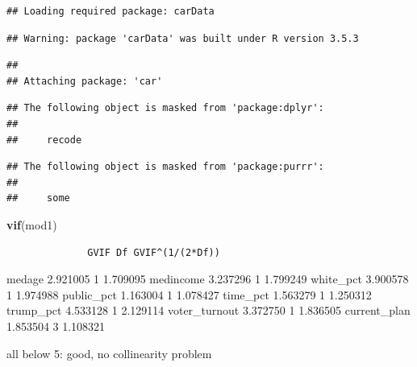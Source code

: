 \documentclass[
]{article}
\newenvironment{Shaded}{\begin{snugshade}}{\end{snugshade}}
\newcommand{\KeywordTok}[1]{\textcolor[rgb]{0.13,0.29,0.53}{\textbf{#1}}}
\newcommand{\NormalTok}[1]{#1}
\begin{document}
\begin{verbatim}
## Loading required package: carData
\end{verbatim}

\begin{verbatim}
## Warning: package 'carData' was built under R version 3.5.3
\end{verbatim}

\begin{verbatim}
## 
## Attaching package: 'car'
\end{verbatim}

\begin{verbatim}
## The following object is masked from 'package:dplyr':
## 
##     recode
\end{verbatim}

\begin{verbatim}
## The following object is masked from 'package:purrr':
## 
##     some
\end{verbatim}

\begin{Shaded}
\begin{Highlighting}[]
\KeywordTok{vif}\NormalTok{(mod1)}
\end{Highlighting}
\end{Shaded}

\begin{verbatim}
              GVIF Df GVIF^(1/(2*Df))
\end{verbatim}

medage 2.921005 1 1.709095 medincome 3.237296 1 1.799249 white\_pct
3.900578 1 1.974988 public\_pct 1.163004 1 1.078427 time\_pct 1.563279 1
1.250312 trump\_pct 4.533128 1 2.129114 voter\_turnout 3.372750 1
1.836505 current\_plan 1.853504 3 1.108321

all below 5: good, no collinearity problem
\end{document}
